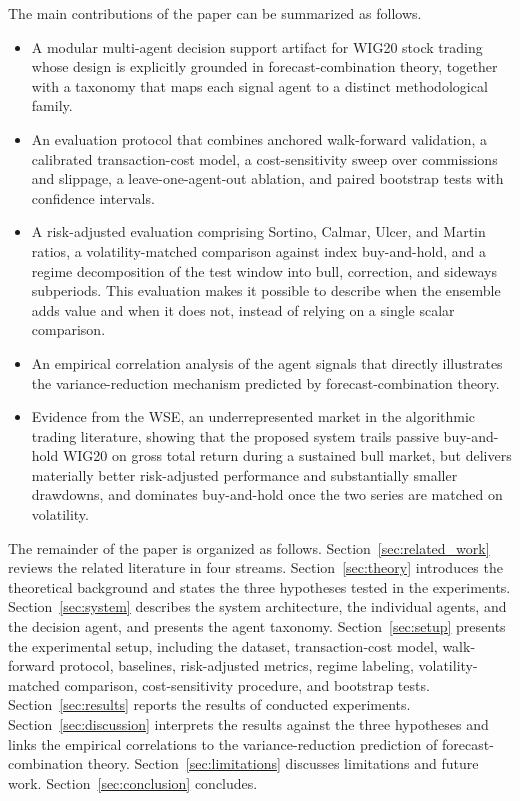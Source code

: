 \documentclass{ieeeaccess}
\begin{document}
The main contributions of the paper can be summarized as follows.
\begin{itemize}
\item A modular multi-agent decision support artifact for WIG20 stock trading whose design is explicitly grounded in forecast-combination theory, together with a taxonomy that maps each signal agent to a distinct methodological family.
\item An evaluation protocol that combines anchored walk-forward validation, a calibrated transaction-cost model, a cost-sensitivity sweep over commissions and slippage, a leave-one-agent-out ablation, and paired bootstrap tests with confidence intervals.
\item A risk-adjusted evaluation comprising Sortino, Calmar, Ulcer, and Martin ratios, a volatility-matched comparison against index buy-and-hold, and a regime decomposition of the test window into bull, correction, and sideways subperiods. This evaluation makes it possible to describe when the ensemble adds value and when it does not, instead of relying on a single scalar comparison.
\item An empirical correlation analysis of the agent signals that directly illustrates the variance-reduction mechanism predicted by forecast-combination theory.
\item Evidence from the WSE, an underrepresented market in the algorithmic trading literature, showing that the proposed system trails passive buy-and-hold WIG20 on gross total return during a sustained bull market, but delivers materially better risk-adjusted performance and substantially smaller drawdowns, and dominates buy-and-hold once the two series are matched on volatility.
\end{itemize}

The remainder of the paper is organized as follows. Section~\ref{sec:related_work} reviews the related literature in four streams. Section~\ref{sec:theory} introduces the theoretical background and states the three hypotheses tested in the experiments. Section~\ref{sec:system} describes the system architecture, the individual agents, and the decision agent, and presents the agent taxonomy. Section~\ref{sec:setup} presents the experimental setup, including the dataset, transaction-cost model, walk-forward protocol, baselines, risk-adjusted metrics, regime labeling, volatility-matched comparison, cost-sensitivity procedure, and bootstrap tests. Section~\ref{sec:results} reports the results of conducted experiments. Section~\ref{sec:discussion} interprets the results against the three hypotheses and links the empirical correlations to the variance-reduction prediction of forecast-combination theory. Section~\ref{sec:limitations} discusses limitations and future work. Section~\ref{sec:conclusion} concludes.
\end{document}
